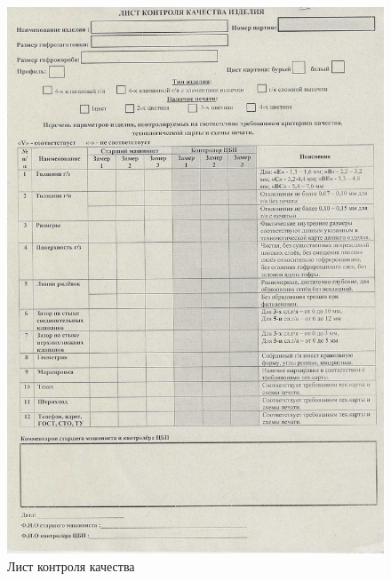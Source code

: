 \begin{figure}
\begin{center}
 \includegraphics[height=0.9\textheight, keepaspectratio]{Pics/VI.jpg}
\end{center}
 \caption{Лист контроля качества}
 \label{pic:VI}
\end{figure}

